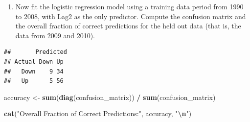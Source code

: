 \documentclass[
]{article}
\newenvironment{Shaded}{\begin{snugshade}}{\end{snugshade}}
\newcommand{\AttributeTok}[1]{\textcolor[rgb]{0.13,0.29,0.53}{#1}}
\newcommand{\DecValTok}[1]{\textcolor[rgb]{0.00,0.00,0.81}{#1}}
\newcommand{\FloatTok}[1]{\textcolor[rgb]{0.00,0.00,0.81}{#1}}
\newcommand{\FunctionTok}[1]{\textcolor[rgb]{0.13,0.29,0.53}{\textbf{#1}}}
\newcommand{\NormalTok}[1]{#1}
\newcommand{\OtherTok}[1]{\textcolor[rgb]{0.56,0.35,0.01}{#1}}
\newcommand{\SpecialCharTok}[1]{\textcolor[rgb]{0.81,0.36,0.00}{\textbf{#1}}}
\newcommand{\StringTok}[1]{\textcolor[rgb]{0.31,0.60,0.02}{#1}}
\providecommand{\tightlist}{%
  \setlength{\itemsep}{0pt}\setlength{\parskip}{0pt}}
\begin{document}
\begin{enumerate}
\def\labelenumi{(\alph{enumi})}
\setcounter{enumi}{3}
\tightlist
\item
  Now fit the logistic regression model using a training data period
  from 1990 to 2008, with Lag2 as the only predictor. Compute the
  confusion matrix and the overall fraction of correct predictions for
  the held out data (that is, the data from 2009 and 2010).
\end{enumerate}

\begin{Shaded}
\end{Shaded}

\begin{verbatim}
##       Predicted
## Actual Down Up
##   Down    9 34
##   Up      5 56
\end{verbatim}

\begin{Shaded}
\begin{Highlighting}[]
\NormalTok{accuracy }\OtherTok{\textless{}{-}} \FunctionTok{sum}\NormalTok{(}\FunctionTok{diag}\NormalTok{(confusion\_matrix)) }\SpecialCharTok{/} \FunctionTok{sum}\NormalTok{(confusion\_matrix)}

\FunctionTok{cat}\NormalTok{(}\StringTok{"Overall Fraction of Correct Predictions:"}\NormalTok{, accuracy, }\StringTok{"}\SpecialCharTok{\textbackslash{}n}\StringTok{"}\NormalTok{)}
\end{Highlighting}
\end{Shaded}
\end{document}

